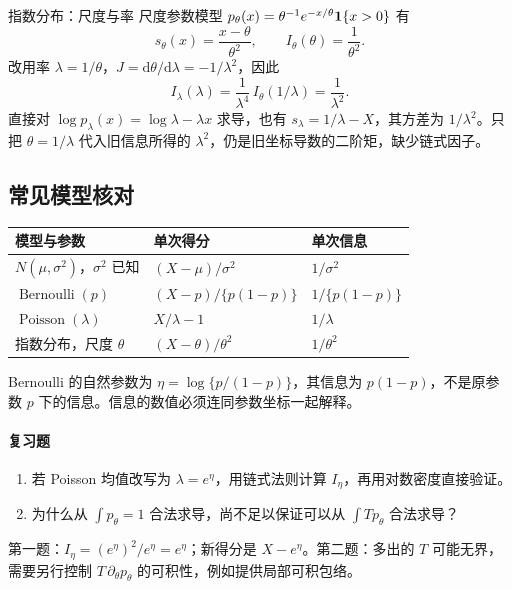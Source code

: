 \begin{examplebox}{指数分布：尺度与率}
尺度参数模型 $p_\theta(x)=\theta^{-1}e^{-x/\theta}\mathbf 1\{x>0\}$ 有
\[
 s_\theta(x)=\frac{x-\theta}{\theta^2},\qquad
 I_\theta(\theta)=\frac1{\theta^2}.
\]
改用率 $\lambda=1/\theta$，$J=\mathrm d\theta/\mathrm d\lambda=-1/\lambda^2$，因此
\[
 I_\lambda(\lambda)=\frac1{\lambda^4}\,I_\theta(1/\lambda)
 =\frac1{\lambda^2}.
\]
直接对 $\log p_\lambda(x)=\log\lambda-\lambda x$ 求导，也有 $s_\lambda=1/\lambda-X$，其方差为 $1/\lambda^2$。只把 $\theta=1/\lambda$ 代入旧信息所得的 $\lambda^2$，仍是旧坐标导数的二阶矩，缺少链式因子。
\end{examplebox}

\subsection{常见模型核对}
\begin{center}
\begin{tabularx}{\textwidth}{@{}lXX@{}}
\toprule
模型与参数 & 单次得分 & 单次信息\\
\midrule
$N(\mu,\sigma^2)$，$\sigma^2$ 已知 & $(X-\mu)/\sigma^2$ & $1/\sigma^2$\\
$\operatorname{Bernoulli}(p)$ & $(X-p)/\{p(1-p)\}$ & $1/\{p(1-p)\}$\\
$\operatorname{Poisson}(\lambda)$ & $X/\lambda-1$ & $1/\lambda$\\
指数分布，尺度 $\theta$ & $(X-\theta)/\theta^2$ & $1/\theta^2$\\
\bottomrule
\end{tabularx}
\end{center}
Bernoulli 的自然参数为 $\eta=\log\{p/(1-p)\}$，其信息为 $p(1-p)$，不是原参数 $p$ 下的信息。信息的数值必须连同参数坐标一起解释。

\paragraph{复习题}
\begin{enumerate}
 \item 若 Poisson 均值改写为 $\lambda=e^\eta$，用链式法则计算 $I_\eta$，再用对数密度直接验证。
 \item 为什么从 $\int p_\theta=1$ 合法求导，尚不足以保证可以从 $\int T p_\theta$ 合法求导？
\end{enumerate}
\begin{notebox}[答案线索]
第一题：$I_\eta=(e^\eta)^2/e^\eta=e^\eta$；新得分是 $X-e^\eta$。第二题：多出的 $T$ 可能无界，需要另行控制 $T\,\partial_\theta p_\theta$ 的可积性，例如提供局部可积包络。
\end{notebox}

